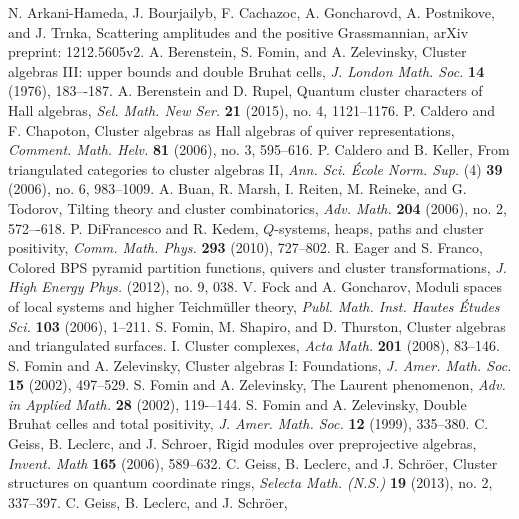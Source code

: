 \documentclass{amsart}
\theoremstyle{definition}
\theoremstyle{remark}
\numberwithin{equation}{section}
\begin{document}
\begin{thebibliography}{99}
   N. Arkani-Hameda, J. Bourjailyb, F. Cachazoc, A. Goncharovd, A. Postnikove, and J. Trnka, Scattering amplitudes and the positive Grassmannian, arXiv preprint: 1212.5605v2.
   A. Berenstein, S. Fomin, and A. Zelevinsky, Cluster algebras III: upper bounds and double Bruhat cells, \textsl{J. London Math. Soc.} \textbf{14} (1976), 183–-187.
   A. Berenstein and D. Rupel, Quantum cluster characters of Hall algebras, \textsl{Sel. Math. New Ser.} \textbf{21} (2015), no. 4, 1121--1176.
   P. Caldero and F. Chapoton, Cluster algebras as Hall algebras of quiver representations, \textsl{Comment. Math. Helv.} \textbf{81} (2006), no. 3, 595--616.
   P. Caldero and B. Keller, From triangulated categories to cluster algebras II, \textsl{Ann. Sci. \'Ecole Norm. Sup.} (4) \textbf{39} (2006), no. 6, 983--1009.
   A. Buan, R. Marsh, I. Reiten, M. Reineke, and G. Todorov, Tilting theory and cluster combinatorics, \textsl{Adv. Math.} \textbf{204} (2006), no. 2, 572–-618.
	 P. DiFrancesco and R. Kedem, $Q$-systems, heaps, paths and cluster positivity, \textsl{Comm. Math. Phys.} \textbf{293} (2010), 727--802.
   R. Eager and S. Franco, Colored BPS pyramid partition functions, quivers and cluster transformations, \textsl{J. High Energy Phys.} (2012), no. 9, 038.
	 V. Fock and A. Goncharov, Moduli spaces of local systems and higher Teichmüller theory, \textsl{Publ. Math. Inst. Hautes Études Sci.} \textbf{103} (2006), 1--211.
	 S. Fomin, M. Shapiro, and D. Thurston, Cluster algebras and triangulated surfaces. I. Cluster complexes, \textsl{Acta Math.} \textbf{201} (2008), 83--146.
	 S. Fomin and A. Zelevinsky, Cluster algebras I: Foundations, \textsl{J. Amer. Math. Soc.} \textbf{15} (2002), 497--529.
   S. Fomin and A. Zelevinsky, The Laurent phenomenon, \textsl{Adv. in Applied Math.} \textbf{28} (2002), 119-–144.
	 S. Fomin and A. Zelevinsky, Double Bruhat celles and total positivity, \textsl{J. Amer. Math. Soc.} \textbf{12} (1999), 335--380.
	 C. Geiss, B. Leclerc, and J. Schroer, Rigid modules over preprojective algebras, \textsl{Invent. Math} \textbf{165} (2006), 589--632.
   C. Geiss, B. Leclerc, and J. Schr\"oer, Cluster structures on quantum coordinate rings, \textsl{Selecta Math. (N.S.)} \textbf{19} (2013), no. 2, 337--397.
   C. Geiss, B. Leclerc, and J. Schr\"oer,

\end{thebibliography}
\end{document}
